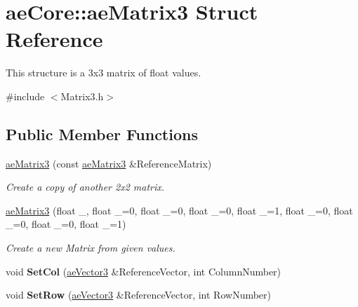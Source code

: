 \hypertarget{structae_core_1_1ae_matrix3}{}\section{ae\+Core\+:\+:ae\+Matrix3 Struct Reference}
\label{structae_core_1_1ae_matrix3}


This structure is a 3x3 matrix of float values.  




{\ttfamily \#include $<$Matrix3.\+h$>$}

\subsection*{Public Member Functions}
\begin{DoxyCompactItemize}
\item 
\hyperlink{structae_core_1_1ae_matrix3_ae6db4e959d0cbfbfe741c3c6a479dcae}{ae\+Matrix3} (const \hyperlink{structae_core_1_1ae_matrix3}{ae\+Matrix3} \&Reference\+Matrix)\hypertarget{structae_core_1_1ae_matrix3_ae6db4e959d0cbfbfe741c3c6a479dcae}{}\label{structae_core_1_1ae_matrix3_ae6db4e959d0cbfbfe741c3c6a479dcae}

\begin{DoxyCompactList}\small\item\em Create a copy of another 2x2 matrix. \end{DoxyCompactList}\item 
\hyperlink{structae_core_1_1ae_matrix3_ab2f2c69ccb0dfad3daa9baa444fccd00}{ae\+Matrix3} (float \+\_, float \+\_=0, float \+\_=0, float \+\_=0, float \+\_=1, float \+\_=0, float \+\_=0, float \+\_=0, float \+\_=1)\hypertarget{structae_core_1_1ae_matrix3_ab2f2c69ccb0dfad3daa9baa444fccd00}{}\label{structae_core_1_1ae_matrix3_ab2f2c69ccb0dfad3daa9baa444fccd00}

\begin{DoxyCompactList}\small\item\em Create a new Matrix from given values. \end{DoxyCompactList}\item 
void {\bfseries Set\+Col} (\hyperlink{structae_core_1_1ae_vector3}{ae\+Vector3} \&Reference\+Vector, int Column\+Number)\hypertarget{structae_core_1_1ae_matrix3_a2b0dd3c1ceb10107c8871e33adde3f47}{}\label{structae_core_1_1ae_matrix3_a2b0dd3c1ceb10107c8871e33adde3f47}

\item 
void {\bfseries Set\+Row} (\hyperlink{structae_core_1_1ae_vector3}{ae\+Vector3} \&Reference\+Vector, int Row\+Number)\hypertarget{structae_core_1_1ae_matrix3_a0a3df9088e467cd240b12b92421bcb62}{}\label{structae_core_1_1ae_matrix3_a0a3df9088e467cd240b12b92421bcb62}


\end{DoxyCompactItemize}
